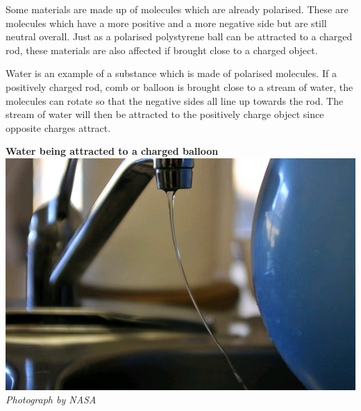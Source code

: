 \label{m38780*id201923}Some materials are made up of molecules which are already polarised.
These are molecules which have
a more positive and a more negative side but are still neutral overall.
Just as a polarised polystyrene ball can be attracted to a charged rod, these materials
are also affected if brought close to a charged object.\par 
 
\begin{minipage}{.5\textwidth}
        
        \label{m38780*id201929}Water is an example of a substance which is made of polarised molecules.
If a positively charged rod, comb or balloon is brought close to a stream of water, the molecules can rotate
so that the negative sides all line up towards the rod.
The stream of water will then be attracted to the positively charge object since opposite charges attract.
    \end{minipage}
\begin{minipage}{.5\textwidth}
\begin{center}
 \textbf{Water being attracted to a charged balloon}\\

 \includegraphics[width=.8\textwidth]{photos/waterandballoon.jpg}\\
\textsl{Photograph by NASA}
\end{center}
\end{minipage}
            \nopagebreak
